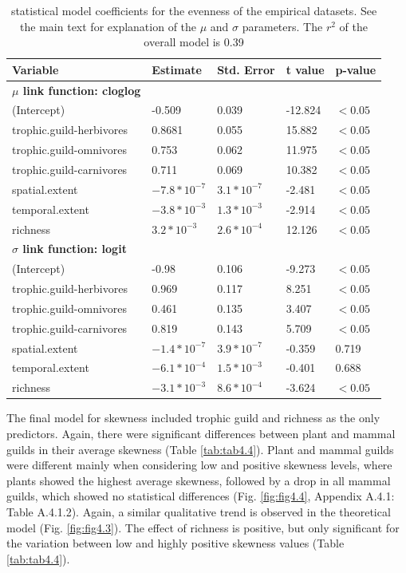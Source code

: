\begin{table}[htbp!]
\centering
\caption[Evenness model coefficients]{\color{Gray} statistical model coefficients for the evenness of the empirical datasets. See the main text for explanation of the $\mu$ and $\sigma$ parameters. The $r^2$ of the overall model is 0.39}\label{tab:tab4.3}
\begin{tabular}{lllll}
\hline
Variable & Estimate & Std. Error & t value & p-value \\
\hline
\textbf{$\mu$ link function:  cloglog} & & & &  \\
(Intercept)              & -0.509 & 0.039 & -12.824 & $<0.05$ \\
trophic.guild-herbivores   &  0.8681 & 0.055 & 15.882 & $<0.05$ \\
trophic.guild-omnivores    &  0.753 & 0.062 &  11.975 & $<0.05$ \\
trophic.guild-carnivores    &  0.711 & 0.069 & 10.382 & $<0.05$ \\
spatial.extent           & $-7.8*10^{-7}$ & $3.1*10^{-7}$ & -2.481 & $<0.05$ \\
temporal.extent          & $-3.8*10^{-3}$ & $1.3*10^{-3}$ & -2.914 & $<0.05$ \\
richness                 &  $3.2*10^{-3}$ & $2.6*10^{-4}$ & 12.126 & $<0.05$ \\
\hline
\textbf{$\sigma$ link function:  logit} & & & & \\
(Intercept)              & -0.98 & 0.106 & -9.273 & $<0.05$ \\
trophic.guild-herbivores   &  0.969 & 0.117 &  8.251 & $<0.05$ \\
trophic.guild-omnivores    &  0.461 & 0.135 &  3.407 & $<0.05$ \\
trophic.guild-carnivores   &  0.819 & 0.143 &  5.709 & $<0.05$ \\
spatial.extent            &$-1.4*10^{-7}$ & $3.9*10^{-7}$ & -0.359 & 0.719 \\
temporal.extent           &$-6.1*10^{-4}$ & $1.5*10^{-3}$ & -0.401 & 0.688 \\
richness                  &$-3.1*10^{-3}$ & $8.6*10^{-4}$ & -3.624 & $<0.05$ \\
\hline
\end{tabular}

\end{table}

The final model for skewness included trophic guild and richness as the only predictors. Again, there were significant differences between plant and mammal guilds in their average skewness (Table \ref{tab:tab4.4}). Plant and mammal guilds were different mainly when considering low and positive skewness levels, where plants showed the highest average skewness, followed by a drop in all mammal guilds, which showed no statistical differences (Fig. \ref{fig:fig4.4}, Appendix A.4.1: Table A.4.1.2). Again, a similar qualitative trend is observed in the theoretical model (Fig. \ref{fig:fig4.3}). The effect of richness is positive, but only significant for the variation between low and highly positive skewness values (Table \ref{tab:tab4.4}).

